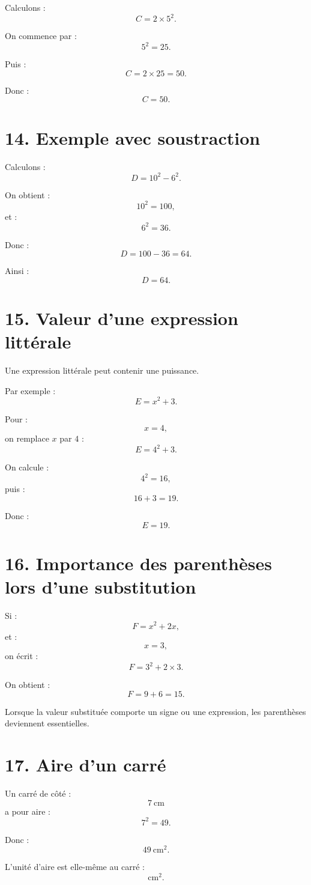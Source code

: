 Calculons :
\[
C=2\times5^2.
\]

On commence par :
\[
5^2=25.
\]

Puis :
\[
C=2\times25=50.
\]

Donc :
\[
\boxed{C=50}.
\]

\section{14. Exemple avec soustraction}

Calculons :
\[
D=10^2-6^2.
\]

On obtient :
\[
10^2=100,
\]
et :
\[
6^2=36.
\]

Donc :
\[
D=100-36=64.
\]

Ainsi :
\[
\boxed{D=64}.
\]

\section{15. Valeur d'une expression littérale}

Une expression littérale peut contenir une puissance.

Par exemple :
\[
E=x^2+3.
\]

Pour :
\[
x=4,
\]
on remplace $x$ par $4$ :
\[
E=4^2+3.
\]

On calcule :
\[
4^2=16,
\]
puis :
\[
16+3=19.
\]

Donc :
\[
\boxed{E=19}.
\]

\section{16. Importance des parenthèses lors d'une substitution}

Si :
\[
F=x^2+2x,
\]
et :
\[
x=3,
\]
on écrit :
\[
F=3^2+2\times3.
\]

On obtient :
\[
F=9+6=15.
\]

Lorsque la valeur substituée comporte un signe ou une expression, les parenthèses deviennent essentielles.

\section{17. Aire d'un carré}

Un carré de côté :
\[
7\ \text{cm}
\]
a pour aire :
\[
7^2=49.
\]

Donc :
\[
\boxed{49\ \text{cm}^2}.
\]

L'unité d'aire est elle-même au carré :
\[
\text{cm}^2.
\]

